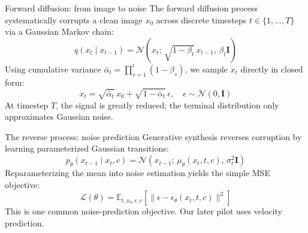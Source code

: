 \documentclass[aspectratio=169,11pt]{beamer}
\begin{document}
\begin{frame}{Forward diffusion: from image to noise}
\normalsize The forward diffusion process systematically corrupts a clean image $x_0$ across discrete timesteps $t \in \{1, \dots, T\}$ via a Gaussian Markov chain:
\[q(x_t \mid x_{t-1}) = \mathcal{N}\left(x_t;\, \sqrt{1 - \beta_t}\, x_{t-1},\, \beta_t \mathbf{I}\right)\]
\vspace{-2mm}
Using cumulative variance $\bar{\alpha}_t = \prod_{s=1}^t (1 - \beta_s)$, we sample $x_t$ directly in closed form:
\[x_t = \sqrt{\bar{\alpha}_t}\, x_0 + \sqrt{1 - \bar{\alpha}_t}\, \epsilon, \quad \epsilon \sim \mathcal{N}(0, \mathbf{I})\]
\small At timestep $T$, the signal is greatly reduced; the terminal distribution only approximates Gaussian noise.
\end{frame}

\begin{frame}{The reverse process: noise prediction}
\normalsize Generative synthesis reverses corruption by learning parameterized Gaussian transitions:
\[p_\theta(x_{t-1} \mid x_t, c) = \mathcal{N}\left(x_{t-1};\, \mu_\theta(x_t, t, c),\, \sigma_t^2 \mathbf{I}\right)\]
\vspace{-2mm}
Reparameterizing the mean into noise estimation yields the simple MSE objective:
\[\mathcal{L}(\theta) = \mathbb{E}_{t, x_0, \epsilon, c} \left[ \|\epsilon - \epsilon_\theta(x_t, t, c)\|^2 \right]\]
\small This is one common noise-prediction objective. Our later pilot uses velocity prediction.
\end{frame}
\end{document}
